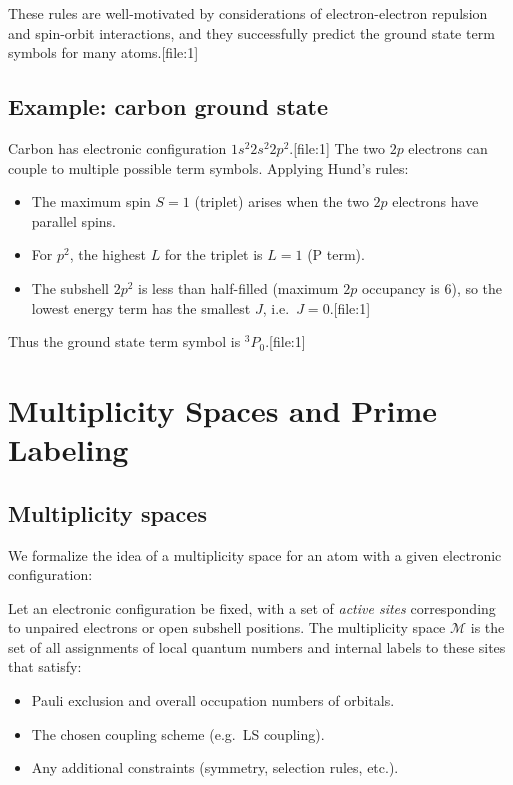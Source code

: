 \documentclass[11pt]{article}
\begin{document}
These rules are well-motivated by considerations of electron-electron repulsion and spin-orbit interactions, and they successfully predict the ground state term symbols for many atoms.[file:1]

\subsection{Example: carbon ground state}

Carbon has electronic configuration \(1s^2 2s^2 2p^2\).[file:1] The two \(2p\) electrons can couple to multiple possible term symbols. Applying Hund's rules:
\begin{itemize}
  \item The maximum spin \(S=1\) (triplet) arises when the two \(2p\) electrons have parallel spins.
  \item For \(p^2\), the highest \(L\) for the triplet is \(L=1\) (P term).
  \item The subshell \(2p^2\) is less than half-filled (maximum \(2p\) occupancy is \(6\)), so the lowest energy term has the smallest \(J\), i.e.\ \(J=0\).[file:1]
\end{itemize}
Thus the ground state term symbol is \(^{3}P_{0}\).[file:1]

\section{Multiplicity Spaces and Prime Labeling}

\subsection{Multiplicity spaces}

We formalize the idea of a multiplicity space for an atom with a given electronic configuration:
\begin{definition}
Let an electronic configuration be fixed, with a set of \emph{active sites} corresponding to unpaired electrons or open subshell positions. The multiplicity space \(\mathcal{M}\) is the set of all assignments of local quantum numbers and internal labels to these sites that satisfy:
\begin{itemize}
  \item Pauli exclusion and overall occupation numbers of orbitals.
  \item The chosen coupling scheme (e.g.\ LS coupling).
  \item Any additional constraints (symmetry, selection rules, etc.).
\end{itemize}
\end{definition}
\end{document}
